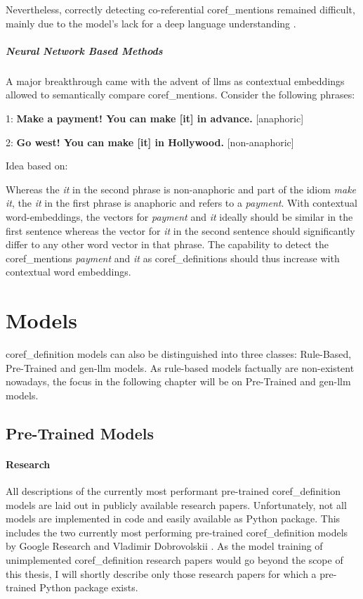 Nevertheless, correctly detecting co-referential \glspl{coref_mention} remained difficult, mainly due to the model's lack for a deep language understanding \cite{StanfordNLPCoref}.

\subparagraph{Neural Network Based Methods}
A major breakthrough came with the advent of \glspl{llm} as contextual embeddings allowed to semantically compare \glspl{coref_mention}.
Consider the following phrases:

\begin{center}
    1: \textbf{Make a payment! You can make [it] in advance.} [anaphoric]
\end{center}
\begin{center}
    2: \textbf{Go west! You can make [it] in Hollywood.} [non-anaphoric]
\end{center}
\begin{center}
    Idea based on: \cite{StanfordNLPCoref}
\end{center}

Whereas the \emph{it} in the second phrase is non-anaphoric and part of the idiom \emph{make it}, the \emph{it} in the first phrase is anaphoric and refers to a \emph{payment}.
With contextual word-embeddings, the vectors for \emph{payment} and \emph{it} ideally should be similar in the first sentence whereas the vector for \emph{it} in the second sentence should significantly differ to any other word vector in that phrase.
The capability to detect the \glspl{coref_mention} \emph{payment} and \emph{it} as \glspl{coref_definition} should thus increase with contextual word embeddings.


\section{Models}\label{sec:models}
\gls{coref_definition} models can also be distinguished into three classes: Rule-Based, Pre-Trained and \gls{gen-llm} models.
As rule-based models factually are non-existent nowadays, the focus in the following chapter will be on Pre-Trained and \gls{gen-llm} models.

\subsection{Pre-Trained Models}\label{subsec:pre-trained-models}
\paragraph{Research}
All descriptions of the currently most performant pre-trained \gls{coref_definition} models are laid out in publicly available research papers.
Unfortunately, not all models are implemented in code and easily available as Python package.
This includes the two currently most performing \cite{CorefEvaluation} pre-trained \gls{coref_definition} models by Google Research \cite{CorefSeq2Seq} and Vladimir Dobrovolskii \cite{CorefDobrovolskii}.
As the model training of unimplemented \gls{coref_definition} research papers would go beyond the scope of this thesis,
I will shortly describe only those research papers for which a pre-trained Python package exists.

